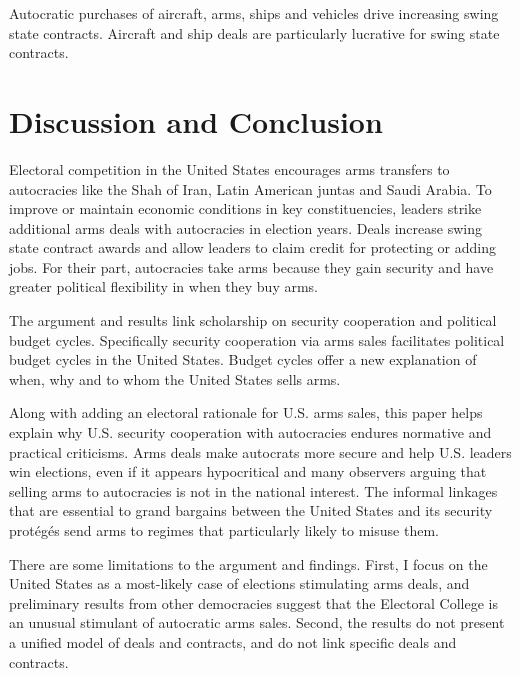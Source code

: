 \documentclass[12pt]{article}
\begin{document}
Autocratic purchases of aircraft, arms, ships and vehicles drive increasing swing state contracts.
Aircraft and ship deals are particularly lucrative for swing state contracts. 



\section{Discussion and Conclusion}


Electoral competition in the United States encourages arms transfers to autocracies like the Shah of Iran, Latin American juntas and Saudi Arabia.
To improve or maintain economic conditions in key constituencies, leaders strike additional arms deals with autocracies in election years.
Deals increase swing state contract awards and allow leaders to claim credit for protecting or adding jobs.
For their part, autocracies take arms because they gain security and have greater political flexibility in when they buy arms. 


The argument and results link scholarship on security cooperation and political budget cycles. 
Specifically security cooperation via arms sales facilitates political budget cycles in the United States. 
Budget cycles offer a new explanation of when, why and to whom the United States sells arms. 


Along with adding an electoral rationale for U.S. arms sales, this paper helps explain why U.S. security cooperation with autocracies endures normative and practical criticisms. 
Arms deals make autocrats more secure and help U.S. leaders win elections, even if it appears hypocritical and many observers arguing that selling arms to autocracies is not in the national interest. 
The informal linkages that are essential to grand bargains between the United States and its security prot{\'e}g{\'e}s send arms to regimes that particularly likely to misuse them. 


There are some limitations to the argument and findings.
First, I focus on the United States as a most-likely case of elections stimulating arms deals, and preliminary results from other democracies suggest that the Electoral College is an unusual stimulant of autocratic arms sales. 
Second, the results do not present a unified model of deals and contracts, and do not link specific deals and contracts. 
\end{document}
